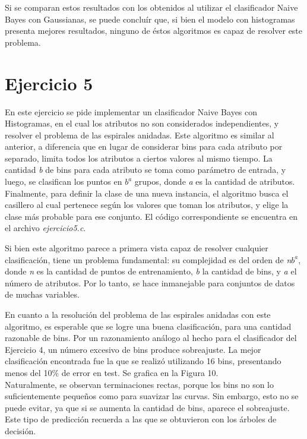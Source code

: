\documentclass[12pt, a4paper]{article}
\begin{document}
\bigskip

Si se comparan estos resultados con los obtenidos al utilizar el clasificador Naive Bayes con Gaussianas, se puede concluír que, si bien el modelo con histogramas presenta mejores resultados, ninguno de éstos algoritmos es capaz de resolver este problema.

\section*{Ejercicio 5}
En este ejercicio se pide implementar un clasificador Naive Bayes con Histogramas, en el cual los atributos no son considerados independientes, y resolver el problema de las espirales anidadas. Este algoritmo es similar al anterior, a diferencia que en lugar de considerar bins para cada atributo por separado, limita todos los atributos a ciertos valores al mismo tiempo. La cantidad \textit{b} de bins para cada atributo se toma como parámetro de entrada, y luego, se clasifican los puntos en $\textit{b}^{a}$ grupos, donde \textit{a} es la cantidad de atributos. Finalmente, para definir la clase de una nueva instancia, el algoritmo busca el casillero al cual pertenece según los valores que toman los atributos, y elige la clase más probable para ese conjunto. El código correspondiente se encuentra en el archivo \textit{ejercicio5.c}.

\bigskip

Si bien este algoritmo parece a primera vista capaz de resolver cualquier clasificación, tiene un problema fundamental: su complejidad es del orden de \textit{n}$\textit{b}^{a}$, donde \textit{n} es la cantidad de puntos de entrenamiento, \textit{b} la cantidad de bins, y \textit{a} el número de atributos. Por lo tanto, se hace inmanejable para conjuntos de datos de muchas variables.

\bigskip

En cuanto a la resolución del problema de las espirales anidadas con este algoritmo, es esperable que se logre una buena clasificación, para una cantidad razonable de bins. Por un razonamiento análogo al hecho para el clasificador del Ejercicio 4, un número excesivo de bins produce sobreajuste. La mejor clasificación encontrada fue la que se realizó utilizando 16 bins, presentando menos del 10\% de error en test. Se grafica en la Figura 10.\\
Naturalmente, se observan terminaciones rectas, porque los bins no son lo suficientemente pequeños como para suavizar las curvas. Sin embargo, esto no se puede evitar, ya que si se aumenta la cantidad de bins, aparece el sobreajuste. Este tipo de predicción recuerda a las que se obtuvieron con los árboles de decisión.
\end{document}
